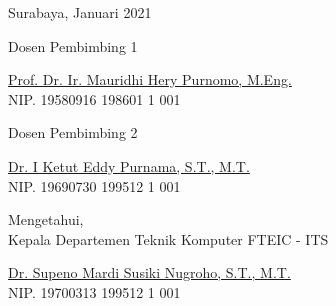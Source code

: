 \begin{flushright}
  Surabaya, Januari 2021
\end{flushright}
\vspace{1ex}

\begin{center}

  \begin{multicols}{2}

    Dosen Pembimbing 1
    \vspace{12ex}

    \underline{Prof. Dr. Ir. Mauridhi Hery Purnomo, M.Eng.} \\
    NIP. 19580916 198601 1 001

    \columnbreak

    Dosen Pembimbing 2
    \vspace{12ex}

    \underline{Dr. I Ketut Eddy Purnama, S.T., M.T.} \\
    NIP. 19690730 199512 1 001

  \end{multicols}
  \vspace{6ex}

  Mengetahui, \\
  Kepala Departemen Teknik Komputer FTEIC - ITS
  \vspace{12ex}

  \underline{Dr. Supeno Mardi Susiki Nugroho, S.T., M.T.} \\
  NIP. 19700313 199512 1 001

\end{center}
